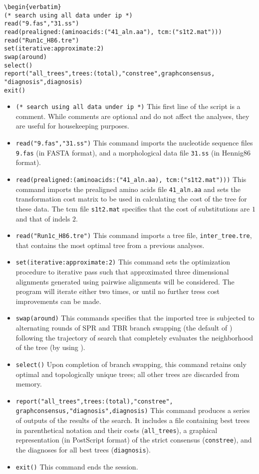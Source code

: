 \begin{verbatim}
\begin{verbatim}
(* search using all data under ip *)
read("9.fas","31.ss")
read(prealigned:(aminoacids:("41_aln.aa"), tcm:("s1t2.mat")))
read("Run1c_H86.tre")
set(iterative:approximate:2)
swap(around)
select()
report("all_trees",trees:(total),"constree",graphconsensus,
"diagnosis",diagnosis)
exit()
\end{verbatim}

\begin{itemize}
\item \texttt{(* search using all data under ip *)} This first line of the script is a comment. While comments are 
optional and do not affect the analyses, they are useful for housekeeping purposes.
\item \texttt{read("9.fas","31.ss")} This command imports the nucleotide sequence files \texttt{9.fas} (in FASTA 
format), and a morphological data file \texttt{31.ss} (in Hennig86 format).
\item \texttt{read(prealigned:(aminoacids:("41\_aln.aa), tcm:("s1t2.mat")))} This command imports the prealigned
amino acids file \texttt{41\_aln.aa} and sets the transformation cost matrix to be used in calculating the cost of the tree
for these data.  The tcm file \texttt{s1t2.mat} specifies that the cost of substitutions are $1$ and that of indels $2$.
\item \texttt{read("Run1c\_H86.tre")} This command imports a tree file, \texttt{inter\_tree.tre}, that contains the most 
optimal tree from a previous analyses. 
\item \texttt{set(iterative:approximate:2)} This command sets the optimization procedure to iterative pass such 
that approximated three dimensional alignments generated using pairwise alignments will be considered.  
The program will iterate either two times, or until no further tress cost improvements can be made.
\item \texttt{swap(around)} This commands specifies that the imported tree is subjected to alternating rounds of SPR 
and TBR branch swapping (the default of \poy) following the trajectory of search that completely 
evaluates the neighborhood of the tree (by using ).
\item \texttt{select()} Upon completion of branch swapping, this command retains only optimal and topologically 
unique trees; all other trees are discarded from memory.
\item \texttt{report("all\_trees",trees:(total),"constree",\\graphconsensus,"diagnosis",diagnosis)} This command 
produces a series of outputs of the results of the search. It includes a file containing best trees in parenthetical 
notation and their costs (\texttt{all\_trees}), a graphical representation (in PostScript format) of the strict 
consensus (\texttt{constree}), and the diagnoses for all best trees (\texttt{diagnosis}).
\item \texttt{exit()} This command ends the \poy session.
\end{itemize}

